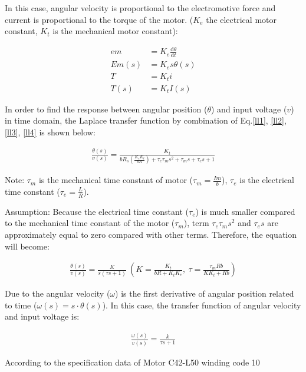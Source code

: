 \documentclass[conference]{IEEEtran}
\begin{document}
In this case, angular velocity is proportional to the electromotive force and current is proportional to the torque of the motor. ($K_e$ the electrical motor constant, $K_t$ is the mechanical motor constant):

\begin{align}
    em &= K_e \frac{\textrm{d} \theta}{\textrm{d} t}\\
    Em(s) &= K_e s \theta(s)\\ \label{ll3}
    T &= K_t i\\
    T(s) &= K_t I(s) \label{ll4}
\end{align}

In order to find the response between angular position ($\theta$) and input voltage ($v$) in time domain, the Laplace transfer function by combination of Eq.\ref{ll1}, \ref{ll2}, \ref{ll3}, \ref{ll4} is shown below:

\begin{align}
    \frac{\theta (s)}{v(s)} = \frac{K_t}{bR_s (\frac{K_e K_t}{bR}) + \tau_e \tau_m s^2 + \tau_m s + \tau_e s +1}
\end{align}

Note: $\tau_m$ is the mechanical time constant of motor ($\tau_m=\frac{Im}{b}$), $\tau_e$ is the electrical time constant ($\tau_e=\frac{L}{R}$).

Assumption: Because the electrical time constant ($\tau_e$) is much smaller compared to the mechanical time constant of the motor ($\tau_m$), term $\tau_e\tau_ms^2$ and $\tau_es$ are approximately equal to zero compared with other terms. Therefore, the equation will become:

\begin{align}
    \frac{\theta (s)}{v(s)} = \frac{K}{s(\tau s + 1)} \ \left( K = \frac{K_t}{bR + K_t K_e}, \ \tau = \frac{\tau_m Rb}{K K_t + Rb} \right)
\end{align}

Due to the angular velocity ($\omega$) is the first derivative of angular position related to time ($\omega\left(s\right)=s\cdot\theta\left(s\right)$). In this case, the transfer function of angular velocity and input voltage is:

\begin{align}
    \frac{\omega(s)}{v(s)} = \frac{k}{\tau s + 1}
\end{align}

According to the specification data of Motor C42-L50 winding code 10 
\end{document}
